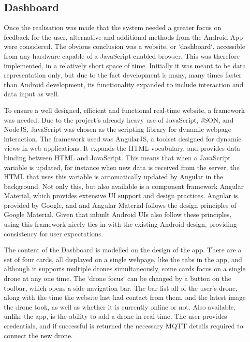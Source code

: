 \documentclass{article}
\begin{document}
\subsection{Dashboard} \label{Dashboard}
Once the realisation was made that the system needed a greater focus on feedback for the user, alternative and additional methods from the Android App were considered. The obvious conclusion was a website, or `dashboard`, accessible from any hardware capable of a JavaScript enabled browser. This was therefore implemented, in a relatively short space of time. Initially it was meant to be data representation only, but due to the fact development is many, many times faster than Android development, its functionality expanded to include interaction and data input as well. 

To ensure a well designed, efficient and functional real-time website, a framework was needed. Due to the project's already heavy use of JavaScript, JSON, and NodeJS, JavaScript was chosen as the scripting library for dynamic webpage interaction. The framework used was AngularJS, a toolset designed for dynamic views in web applications\cite{AngularJS}. It expands the HTML vocabulary, and provides data binding between HTML and JavaScript. This means that when a JavaScript variable is updated, for instance when new data is received from the server, the HTML that uses this variable is automatically updated by Angular in the background. Not only this, but also available is a component framework Angular Material\cite{AngularMaterial}, which provides extensive UI support and design practices. Angular is provided by Google, and and Angular Material follows the design principles of Google Material\cite{GoogleMaterial}. Given that inbuilt Android UIs also follow these principles, using this framework nicely ties in with the existing Android design, providing consistency for user expectations. 

The content of the Dashboard is modelled on the design of the app. There are a set of four cards, all displayed on a single webpage, like the tabs in the app, and although it supports multiple drones simultaneously, some cards focus on a single drone at any one time. The `drone focus` can be changed by a button on the toolbar, which opens a side navigation bar. The bar list all of the user's drone, along with the time the website last had contact from them, and the latest image the drone took, as well as whether it is currently online or not. Also available, unlike the app, is the ability to add a drone in real time. The user provides credentials, and if successful is returned the necessary MQTT details required to connect the new drone.
\end{document}

